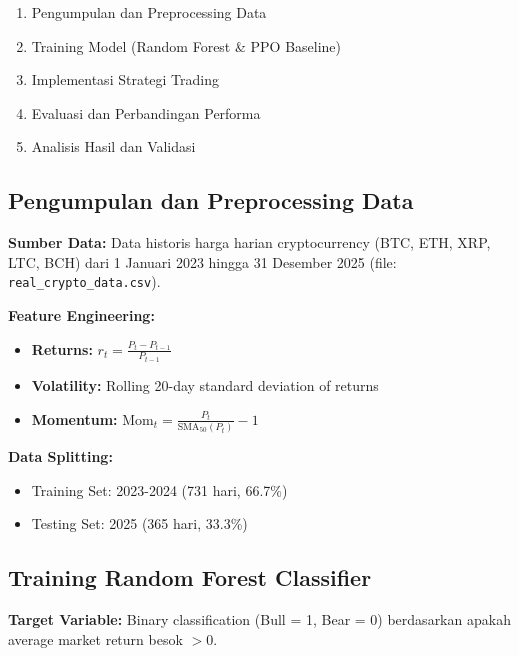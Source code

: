 \documentclass[12pt,a4paper]{article}
\begin{document}
\begin{enumerate}
    \item Pengumpulan dan Preprocessing Data
    \item Training Model (Random Forest \& PPO Baseline)
    \item Implementasi Strategi Trading
    \item Evaluasi dan Perbandingan Performa
    \item Analisis Hasil dan Validasi
\end{enumerate}


\subsection{Pengumpulan dan Preprocessing Data}

\textbf{Sumber Data:} Data historis harga harian cryptocurrency (BTC, ETH, XRP, LTC, BCH) dari 1 Januari 2023 hingga 31 Desember 2025 (file: \texttt{real\_crypto\_data.csv}).

\textbf{Feature Engineering:}
\begin{itemize}
    \item \textbf{Returns:} $r_t = \frac{P_t - P_{t-1}}{P_{t-1}}$
    \item \textbf{Volatility:} Rolling 20-day standard deviation of returns
    \item \textbf{Momentum:} $\text{Mom}_t = \frac{P_t}{\text{SMA}_{50}(P_t)} - 1$
\end{itemize}

\textbf{Data Splitting:}
\begin{itemize}
    \item Training Set: 2023-2024 (731 hari, 66.7\%)
    \item Testing Set: 2025 (365 hari, 33.3\%)
\end{itemize}

\subsection{Training Random Forest Classifier}

\textbf{Target Variable:} Binary classification (Bull = 1, Bear = 0) berdasarkan apakah average market return besok $> 0$.
\end{document}

